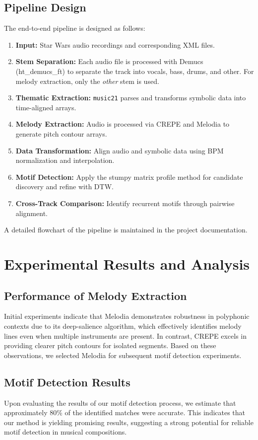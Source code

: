 \documentclass[conference]{IEEEtran}
\begin{document}
\subsection{Pipeline Design}
The end-to-end pipeline is designed as follows:
\begin{enumerate}
    \item \textbf{Input:} Star Wars audio recordings and corresponding XML files.
    \item \textbf{Stem Separation:} Each audio file is processed with Demucs (ht\_demucs\_ft) to separate the track into vocals, bass, drums, and other. For melody extraction, only the \textit{other} stem is used.
    \item \textbf{Thematic Extraction:} \texttt{music21} parses and transforms symbolic data into time-aligned arrays.
    \item \textbf{Melody Extraction:} Audio is processed via CREPE and Melodia to generate pitch contour arrays.
    \item \textbf{Data Transformation:} Align audio and symbolic data using BPM normalization and interpolation.
    \item \textbf{Motif Detection:} Apply the stumpy matrix profile method for candidate discovery and refine with DTW.
    \item \textbf{Cross-Track Comparison:} Identify recurrent motifs through pairwise alignment.
\end{enumerate}

A detailed flowchart of the pipeline is maintained in the project documentation.

\section{Experimental Results and Analysis}

\subsection{Performance of Melody Extraction}
Initial experiments indicate that Melodia demonstrates robustness in polyphonic contexts due to its deep-salience algorithm, which effectively identifies melody lines even when multiple instruments are present. In contrast, CREPE excels in providing clearer pitch contours for isolated segments. Based on these observations, we selected Melodia for subsequent motif detection experiments.

\subsection{Motif Detection Results}
Upon evaluating the results of our motif detection process, we estimate that approximately 80\% of the identified matches were accurate. This indicates that our method is yielding promising results, suggesting a strong potential for reliable motif detection in musical compositions.
\end{document}
